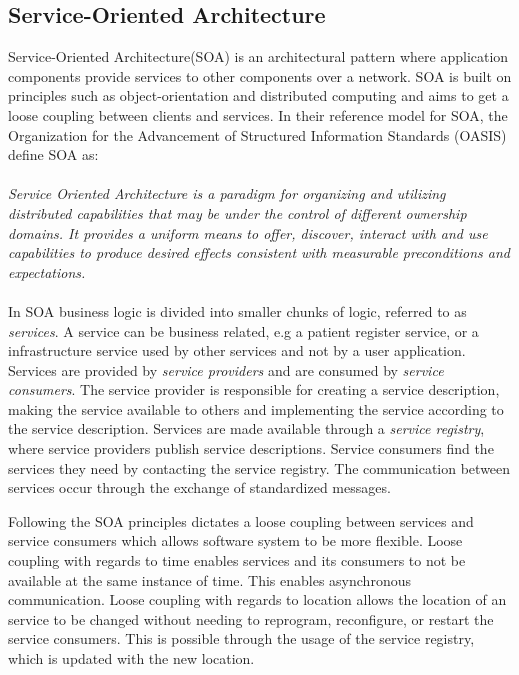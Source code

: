 \documentclass[USenglish]{ifimaster}
\begin{document}
\subsection{Service-Oriented Architecture}
Service-Oriented Architecture(SOA) is an architectural pattern where application
components provide services to other components over a network. SOA is built on
principles such as object-orientation and distributed computing and aims to get
a loose coupling between clients and services. In their reference model for
SOA\cite{oasis-soa-reference-model}, the Organization
for the Advancement of Structured Information Standards (OASIS) define SOA as:
\paragraph{} \textit{Service Oriented Architecture is a paradigm for organizing
and utilizing distributed capabilities that may be under the control of
different ownership domains. It provides a uniform means to offer, discover,
interact with and use capabilities to produce desired effects consistent with
measurable preconditions and expectations.}


\paragraph{}
 In SOA business logic is divided into smaller chunks of logic,
referred to as \textit{services}. A service can be business related, e.g a
patient register service, or a infrastructure service used by other services and
not by a user application.  Services are provided by \textit{service providers}
and are consumed by \textit{service consumers}. The service provider is
responsible for creating a service description, making the service available to
others and implementing the service according to the service description.
Services are made available through a \textit{service registry}, where service
providers publish service descriptions. Service consumers find the services they
need by contacting the service registry. The communication between services
occur through the exchange of standardized messages.

Following the SOA principles dictates a loose coupling between services and
service consumers which allows software system to be more flexible. Loose
coupling with regards to time enables services and its consumers to not be
available at the same instance of time. This enables asynchronous communication.
Loose coupling with regards to location allows the location of an service to be
changed without needing to reprogram, reconfigure, or restart the service
consumers. This is possible through the usage of the service registry, which is
updated with the new location.
\end{document}

